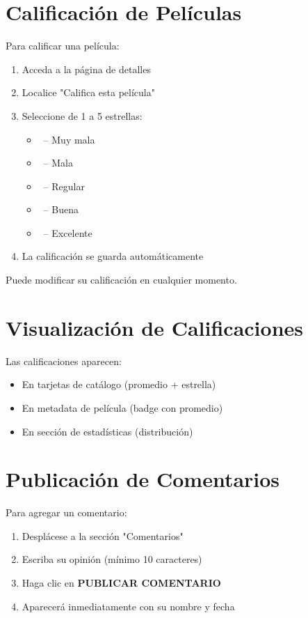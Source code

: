 \documentclass[11pt,a4paper,twoside]{book}
\begin{document}
\section{Calificación de Películas}

Para calificar una película:

\begin{enumerate}
    \item Acceda a la página de detalles
    \item Localice "Califica esta película"
    \item Seleccione de 1 a 5 estrellas:
    \begin{itemize}
        \item \faStarO\ -- Muy mala
        \item \faStarO\faStarO\ -- Mala
        \item \faStarO\faStarO\faStarO\ -- Regular
        \item \faStarO\faStarO\faStarO\faStarO\ -- Buena
        \item \faStarO\faStarO\faStarO\faStarO\faStarO\ -- Excelente
    \end{itemize}
    \item La calificación se guarda automáticamente
\end{enumerate}

\begin{notebox}
Puede modificar su calificación en cualquier momento.
\end{notebox}

\section{Visualización de Calificaciones}

Las calificaciones aparecen:
\begin{itemize}
    \item En tarjetas de catálogo (promedio + estrella)
    \item En metadata de película (badge con promedio)
    \item En sección de estadísticas (distribución)
\end{itemize}

\section{Publicación de Comentarios}

Para agregar un comentario:

\begin{enumerate}
    \item Desplácese a la sección "Comentarios"
    \item Escriba su opinión (mínimo 10 caracteres)
    \item Haga clic en \textbf{PUBLICAR COMENTARIO}
    \item Aparecerá inmediatamente con su nombre y fecha
\end{enumerate}
\end{document}
